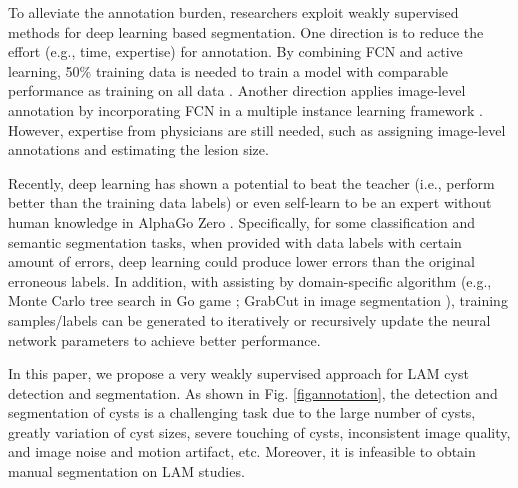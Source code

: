 \documentclass{article}
\begin{document}
To alleviate the annotation burden, researchers exploit weakly supervised methods for deep learning based segmentation. One direction is to reduce the effort (e.g., time, expertise) for annotation. By combining FCN and active learning, 50\% training data is needed to train a model with comparable performance as training on all data \cite{yang2017suggestive}. %
Another direction applies image-level annotation by incorporating FCN in a multiple instance learning framework \cite{jia2017constrained}. However, expertise from physicians are still needed, such as assigning image-level annotations and estimating the lesion size.  

Recently, deep learning has shown a potential to beat the teacher (i.e., perform better than the training data labels) \cite{guan2017said,khoreva2017simple} or even self-learn to be an expert without human knowledge in AlphaGo Zero \cite{silver2017mastering}. Specifically, for some classification \cite{guan2017said} and semantic segmentation \cite{khoreva2017simple} tasks, when provided with data labels with certain amount of errors, deep learning could produce lower errors than the original erroneous labels. In addition, with assisting by domain-specific algorithm (e.g., Monte Carlo tree search in Go game \cite{silver2017mastering}; GrabCut in image segmentation \cite{khoreva2017simple}), training samples/labels can be generated to iteratively or recursively update the neural network parameters to achieve better performance.

In this paper, we propose a very weakly supervised approach for LAM cyst detection and segmentation. %
As shown in Fig. \ref{figannotation}, the detection and segmentation of cysts is a challenging task due to the large number of cysts, greatly variation of cyst sizes, severe touching of cysts, inconsistent image quality, and image noise and motion artifact, etc. 
Moreover, it is infeasible to obtain manual segmentation on LAM studies.
\end{document}
